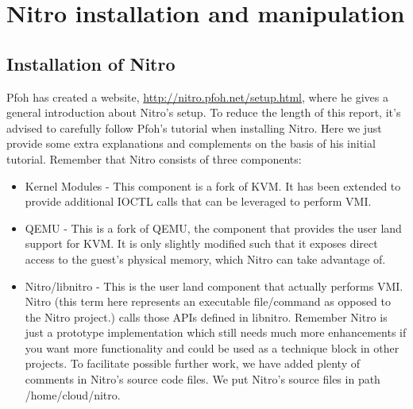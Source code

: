 
\chapter{Nitro installation and manipulation} %

\label{Chapter6} %



\section{Installation of Nitro}

Pfoh has created a website, \url{http://nitro.pfoh.net/setup.html}, where he gives a general introduction about Nitro’s setup. To reduce the length of this 
report, it’s advised to carefully follow Pfoh’s tutorial when installing Nitro. Here we just provide some extra explanations and complements on the basis 
of his initial tutorial. Remember that Nitro consists of three components:
\begin{itemize}
    \item Kernel Modules - This component is a fork of KVM. It has been extended to provide additional IOCTL calls that can be leveraged to perform VMI.
    \item QEMU - This is a fork of QEMU, the component that provides the user land support for KVM. It is only slightly modified such that it exposes direct access to the guest's physical memory, which Nitro can take advantage of.
    \item Nitro/libnitro - This is the user land component that actually performs VMI. Nitro (this term here represents an executable file/command as opposed to the Nitro project.) calls those APIs defined in libnitro. Remember Nitro is just a prototype implementation which still needs much more enhancements if you want more functionality and could be used as a technique block in other projects. To facilitate possible further work, we have added plenty of comments in Nitro’s source code files. We put Nitro’s source files in path /home/cloud/nitro.
\end{itemize}

